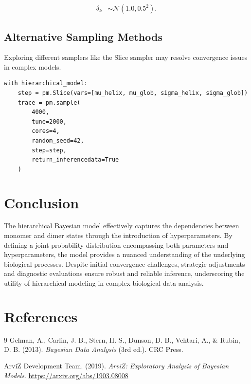 \documentclass[12pt]{article}
\begin{document}
\begin{align}
    \delta_k &\sim \mathcal{N}(1.0, 0.5^2).
\end{align}

\subsection{Alternative Sampling Methods}
Exploring different samplers like the Slice sampler may resolve convergence issues in complex models.

\begin{verbatim}
with hierarchical_model:
    step = pm.Slice(vars=[mu_helix, mu_glob, sigma_helix, sigma_glob])
    trace = pm.sample(
        4000,
        tune=2000,
        cores=4,
        random_seed=42,
        step=step,
        return_inferencedata=True
    )
\end{verbatim}

\section{Conclusion}
The hierarchical Bayesian model effectively captures the dependencies between monomer and dimer states through the introduction of hyperparameters. By defining a joint probability distribution encompassing both parameters and hyperparameters, the model provides a nuanced understanding of the underlying biological processes. Despite initial convergence challenges, strategic adjustments and diagnostic evaluations ensure robust and reliable inference, underscoring the utility of hierarchical modeling in complex biological data analysis.

\section{References}
\begin{thebibliography}{9}
Gelman, A., Carlin, J. B., Stern, H. S., Dunson, D. B., Vehtari, A., \& Rubin, D. B. (2013). \textit{Bayesian Data Analysis} (3rd ed.). CRC Press.

ArviZ Development Team. (2019). \textit{ArviZ: Exploratory Analysis of Bayesian Models}. \url{https://arxiv.org/abs/1903.08008}

\end{thebibliography}
\end{document}
